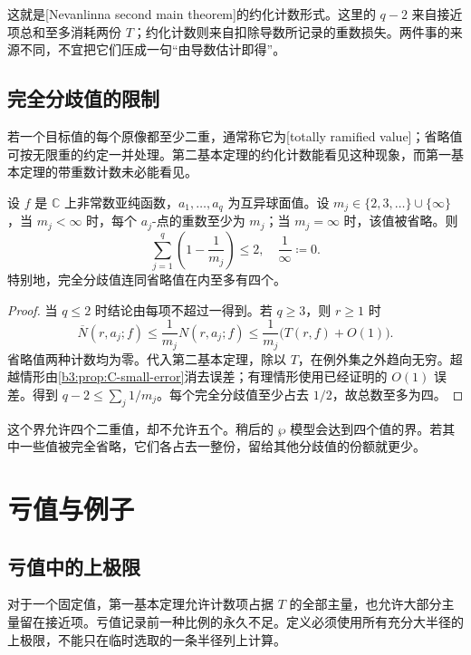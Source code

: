 这就是[Nevanlinna second main theorem]的约化计数形式。这里的 \(q-2\) 来自接近项总和至多消耗两份 \(T\)；约化计数则来自扣除导数所记录的重数损失。两件事的来源不同，不宜把它们压成一句“由导数估计即得”。

\subsection{完全分歧值的限制}
\label{b3:subsec:C0304}

若一个目标值的每个原像都至少二重，通常称它为[totally ramified value]；省略值可按无限重的约定一并处理。第二基本定理的约化计数能看见这种现象，而第一基本定理的带重数计数未必能看见。

\begin{corollary}[重数所占的份额]\label{b3:cor:C-ramified-values}
设 \(f\) 是 \(\mathbb C\) 上非常数亚纯函数，\(a_1,\ldots,a_q\) 为互异球面值。设 \(m_j\in\{2,3,\ldots\}\cup\{\infty\}\)，当 \(m_j<\infty\) 时，每个 \(a_j\)-点的重数至少为 \(m_j\)；当 \(m_j=\infty\) 时，该值被省略。则
\[
 \sum_{j=1}^q\left(1-\frac1{m_j}\right)\le2,
 \quad \frac1\infty\coloneqq0.
\]
特别地，完全分歧值连同省略值在内至多有四个。
\end{corollary}
\begin{proof}
当 \(q\le2\) 时结论由每项不超过一得到。若 \(q\ge3\)，则 \(r\ge1\) 时
\[
 \overline N(r,a_j;f)\le\frac1{m_j}N(r,a_j;f)
 \le\frac1{m_j}\bigl(T(r,f)+O(1)\bigr).
\]
省略值两种计数均为零。代入第二基本定理，除以 \(T\)，在例外集之外趋向无穷。超越情形由\cref{b3:prop:C-small-error}消去误差；有理情形使用已经证明的 \(O(1)\) 误差。得到 \(q-2\le\sum_j1/m_j\)。每个完全分歧值至少占去 \(1/2\)，故总数至多为四。
\end{proof}

这个界允许四个二重值，却不允许五个。稍后的 \(\wp\) 模型会达到四个值的界。若其中一些值被完全省略，它们各占去一整份，留给其他分歧值的份额就更少。

\section{亏值与例子}
\label{b3:sec:C04}

\subsection{亏值中的上极限}
\label{b3:subsec:C0401}

对于一个固定值，第一基本定理允许计数项占据 \(T\) 的全部主量，也允许大部分主量留在接近项。亏值记录前一种比例的永久不足。定义必须使用所有充分大半径的上极限，不能只在临时选取的一条半径列上计算。

